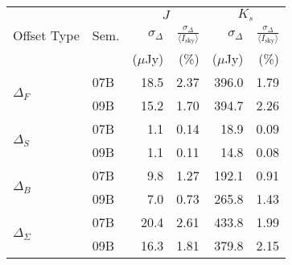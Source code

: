 \begin{tabular}{ll|rr|rr}
&  & \multicolumn{2}{c|}{$J$} & \multicolumn{2}{c}{$K_s$} \\ %
Offset Type & Sem. & $\sigma_\Delta$ & $\frac{\sigma_\Delta}{\langle I_\mathrm{sky}\rangle }$ & $\sigma_\Delta$ & $\frac{\sigma_\Delta}{\langle I_\mathrm{sky}\rangle }$ \\
& & \tiny{($\mu$Jy)} &  \tiny{(\%)} & \tiny{($\mu$Jy)} &  \tiny{(\%)} \\
\hline
\multirow{2}{*}{$\Delta_F$} & 07B & 18.5 & 2.37 & 396.0 & 1.79 \\
& 09B  & 15.2 & 1.70 & 394.7 & 2.26 \\
\hline
\multirow{2}{*}{$\Delta_S$} & 07B & 1.1 & 0.14 & 18.9 & 0.09 \\
& 09B & 1.1 & 0.11 & 14.8 & 0.08 \\
\hline
\multirow{2}{*}{$\Delta_B$} & 07B & 9.8 & 1.27 & 192.1 & 0.91 \\
& 09B &  7.0 & 0.73 & 265.8 & 1.43 \\
\hline
\multirow{2}{*}{$\Delta_\Sigma$} & 07B &  20.4 & 2.61 & 433.8 & 1.99 \\
& 09B &  16.3 & 1.81 & 379.8 & 2.15 \\
\end{tabular}
